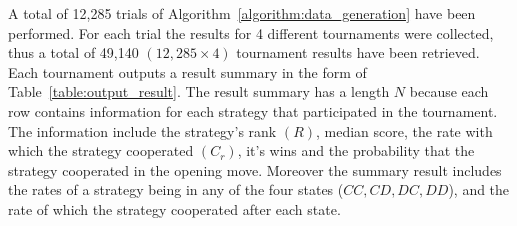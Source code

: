\documentclass{article}
\begin{document}
A total of 12,285 trials of Algorithm~\ref{algorithm:data_generation} have been
performed. For each trial the results for 4 different tournaments were collected,
thus a total of 49,140 $(12,285 \times 4)$ tournament results have been
retrieved. Each tournament outputs a result summary in the form of
Table~\ref{table:output_result}. The result summary has a length \(N\) because
each row contains information for each strategy that participated in the tournament.
The information include the strategy's rank $(R)$, median score, the rate with
which the strategy cooperated $(C_r)$, it's wins and the probability that the strategy
cooperated in the opening move. Moreover the summary result includes the rates
of a strategy being in any of the four states ($CC, CD, DC, DD$), and the rate
of which the strategy cooperated after each state.

\begin{table}[!htbp]
    \begin{center}
\end{center}
\caption{Output result.}\label{table:output_result}
\end{table}
\end{document}
